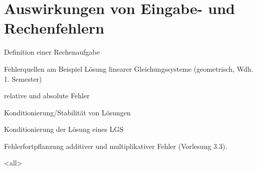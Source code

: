 \mode*
\section{Auswirkungen von Eingabe- und Rechenfehlern}

Definition einer Rechenaufgabe

Fehlerquellen am Beispiel Lösung linearer Gleichungssysteme (geometrisch, Wdh. 1. Semester)

relative und absolute Fehler

Konditionierung/Stabilität von Lösungen

Konditionierung der Lösung eines LGS

Fehlerfortpflanzung additiver und multiplikativer Fehler (Vorlesung 3.3).

\mode<all>

